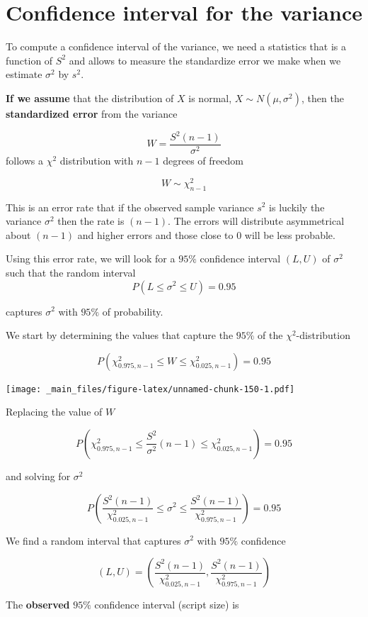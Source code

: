 \documentclass[
]{book}
\begin{document}
\hypertarget{confidence-interval-for-the-variance}{%
\section{Confidence interval for the variance}\label{confidence-interval-for-the-variance}}

To compute a confidence interval of the variance, we need a statistics that is a function of \(S^2\) and allows to measure the standardize error we make when we estimate \(\sigma^2\) by \(s^2\).

\textbf{If we assume} that the distribution of \(X\) is normal, \(X \sim N(\mu, \sigma^2)\), then the \textbf{standardized error} from the variance

\[W=\frac{S^2(n-1)}{\sigma^2}\]
follows a \(\chi^2\) distribution with \(n-1\) degrees of freedom

\[W \sim \chi^2_{n-1}\]

This is an error rate that if the observed sample variance \(s^2\) is luckily the variance \(\sigma^2\) then the rate is \((n-1)\). The errors will distribute asymmetrical about \((n-1)\) and higher errors and those close to \(0\) will be less probable.

Using this error rate, we will look for a \(95\%\) confidence interval \((L,U)\) of \(\sigma^2\) such that the random interval \[P(L \leq \sigma^2 \leq U)=0.95\]

captures \(\sigma^2\) with \(95\%\) of probability.

We start by determining the values that capture the \(95\%\) of the \(\chi^2\)-distribution

\[P(\chi^2_{0.975,n-1} \leq W \leq \chi^2_{0.025,n-1})=0.95\]

\texttt{[image: \_main\_files/figure-latex/unnamed-chunk-150-1.pdf]}

Replacing the value of \(W\)

\[P(\chi^2_{0.975,n-1} \leq \frac{S^2}{\sigma^2}(n-1) \leq \chi^2_{0.025,n-1})=0.95\]

and solving for \(\sigma^2\)

\[P(\frac{S^2 (n-1)}{\chi^2_{0.025,n-1}}\leq \sigma^2 \leq \frac{S^2(n-1)}{\chi^2_{0.975,n-1}})=0.95\]

We find a random interval that captures \(\sigma^2\)
with \(95\%\) confidence

\[(L,U) = (\frac{S^2 (n-1)}{\chi^2_{0.025,n-1}},\frac{S^2(n-1)}{\chi^2_{0.975,n-1}})\]

The \textbf{observed} \(95\%\) confidence interval (script size) is
\end{document}
